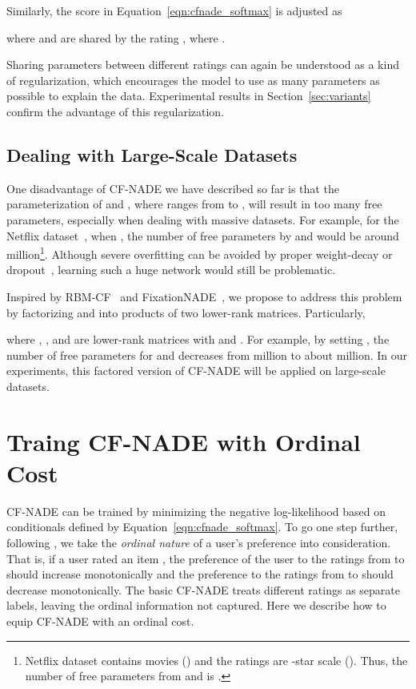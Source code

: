 \documentclass{article}
\newcommand{\cfnade}{CF-NADE\xspace}
\begin{document}
Similarly, the score  in
Equation~\ref{eqn:cfnade_softmax} is adjusted as

where  and  are shared by the rating , where .

Sharing parameters between different ratings can again be understood
as a kind of regularization, which encourages the model to use as many
parameters as possible to explain the data. Experimental results in
Section~\ref{sec:variants} confirm the advantage of this
regularization.




\subsection{Dealing with Large-Scale Datasets}
\label{sec:factored}
One disadvantage of \cfnade we have described so far is that the
parameterization of  and
, where  ranges from  to ,
will result in too many free parameters, especially when dealing with
massive datasets. For example, for the Netflix
dataset~\citep{bennett2007netflix}, when , the number of free
parameters by  and  would be around 
million\footnote{Netflix dataset contains  movies ()
  and the ratings are -star scale (). Thus, the number of free
  parameters from  and  is
  .}. Although severe
overfitting can be avoided by proper weight-decay or
dropout~\citep{srivastava2014dropout}, learning such a huge network
would still be problematic.


Inspired by RBM-CF~\citep{salakhutdinov2007restricted} and
FixationNADE~\citep{zheng2014neural}, we propose to address this
problem by factorizing  and  into products of
two lower-rank matrices. Particularly,

where ,
,  and
 are lower-rank matrices with 
and . For example, by setting , the number of free
parameters for  and  decreases from  million to
about  million. In our experiments, this factored version of \cfnade
will be applied on large-scale datasets.

\section{Traing \cfnade with Ordinal Cost}
\label{sec:cost}



\cfnade can be trained by minimizing the negative log-likelihood based
on conditionals defined by Equation~\ref{eqn:cfnade_softmax}. To go
one step further, following \citet{phung2009ordinal}, we take the
\emph{ordinal nature} of a user's preference into consideration. That
is, if a user rated an item , the preference of the user
to the ratings from  to  should increase monotonically and the
preference to the ratings from  to  should decrease
monotonically. The basic \cfnade treats different ratings as separate
labels, leaving the ordinal information not captured. Here we describe
how to equip \cfnade with an ordinal cost.
\end{document}
